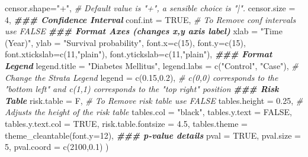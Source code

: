 \documentclass[
]{book}
\newenvironment{Shaded}{\begin{snugshade}}{\end{snugshade}}
\newcommand{\AttributeTok}[1]{\textcolor[rgb]{0.77,0.63,0.00}{#1}}
\newcommand{\CommentTok}[1]{\textcolor[rgb]{0.56,0.35,0.01}{\textit{#1}}}
\newcommand{\ConstantTok}[1]{\textcolor[rgb]{0.00,0.00,0.00}{#1}}
\newcommand{\DecValTok}[1]{\textcolor[rgb]{0.00,0.00,0.81}{#1}}
\newcommand{\DocumentationTok}[1]{\textcolor[rgb]{0.56,0.35,0.01}{\textbf{\textit{#1}}}}
\newcommand{\FloatTok}[1]{\textcolor[rgb]{0.00,0.00,0.81}{#1}}
\newcommand{\FunctionTok}[1]{\textcolor[rgb]{0.00,0.00,0.00}{#1}}
\newcommand{\NormalTok}[1]{#1}
\newcommand{\StringTok}[1]{\textcolor[rgb]{0.31,0.60,0.02}{#1}}
\begin{document}
\begin{Shaded}
\begin{Highlighting}[]
                  \AttributeTok{censor.shape=}\StringTok{"+"}\NormalTok{, }\CommentTok{\# Default value is "+", a sensible choice is "|".}
                  \AttributeTok{censor.size =} \DecValTok{4}\NormalTok{, }
                  \DocumentationTok{\#\#\# Confidence Interval}
                  \AttributeTok{conf.int =} \ConstantTok{TRUE}\NormalTok{, }\CommentTok{\# To Remove conf intervals use FALSE}
                  \DocumentationTok{\#\#\# Format Axes (changes x,y axis label)}
                  \AttributeTok{xlab =} \StringTok{"Time (Year)"}\NormalTok{, }
                  \AttributeTok{ylab =} \StringTok{"Survival probability"}\NormalTok{,}
                  \AttributeTok{font.x=}\FunctionTok{c}\NormalTok{(}\DecValTok{15}\NormalTok{),}
                  \AttributeTok{font.y=}\FunctionTok{c}\NormalTok{(}\DecValTok{15}\NormalTok{),}
                  \AttributeTok{font.xtickslab=}\FunctionTok{c}\NormalTok{(}\DecValTok{11}\NormalTok{,}\StringTok{"plain"}\NormalTok{), }
                  \AttributeTok{font.ytickslab=}\FunctionTok{c}\NormalTok{(}\DecValTok{11}\NormalTok{,}\StringTok{"plain"}\NormalTok{),}
                  \DocumentationTok{\#\#\# Format Legend}
                  \AttributeTok{legend.title =} \StringTok{"Diabetes Mellitus"}\NormalTok{,}
                  \AttributeTok{legend.labs =} \FunctionTok{c}\NormalTok{(}\StringTok{"Control"}\NormalTok{, }\StringTok{"Case"}\NormalTok{), }\CommentTok{\# Change the Strata Legend}
                  \AttributeTok{legend =} \FunctionTok{c}\NormalTok{(}\FloatTok{0.15}\NormalTok{,}\FloatTok{0.2}\NormalTok{), }\CommentTok{\# c(0,0) corresponds to the "bottom left" and c(1,1) corresponds to the "top right" position}
                  \DocumentationTok{\#\#\# Risk Table }
                  \AttributeTok{risk.table =}\NormalTok{ F, }\CommentTok{\# To Remove risk table use FALSE}
                  \AttributeTok{tables.height =} \FloatTok{0.25}\NormalTok{, }\CommentTok{\# Adjusts the height of the risk table}
                  \AttributeTok{tables.col =} \StringTok{"black"}\NormalTok{,}
                  \AttributeTok{tables.y.text =} \ConstantTok{FALSE}\NormalTok{,}
                  \AttributeTok{tables.y.text.col =} \ConstantTok{TRUE}\NormalTok{,}
                  \AttributeTok{risk.table.fontsize =} \FloatTok{4.5}\NormalTok{,}
                  \AttributeTok{tables.theme =} \FunctionTok{theme\_cleantable}\NormalTok{(}\AttributeTok{font.y=}\DecValTok{12}\NormalTok{),}
                  \DocumentationTok{\#\#\# p{-}value details}
                  \AttributeTok{pval =} \ConstantTok{TRUE}\NormalTok{,}
                  \AttributeTok{pval.size =} \DecValTok{5}\NormalTok{,}
                  \AttributeTok{pval.coord =} \FunctionTok{c}\NormalTok{(}\DecValTok{2100}\NormalTok{,}\FloatTok{0.1}\NormalTok{)}
\NormalTok{  ) }
  

\end{Highlighting}
\end{Shaded}
\end{document}
